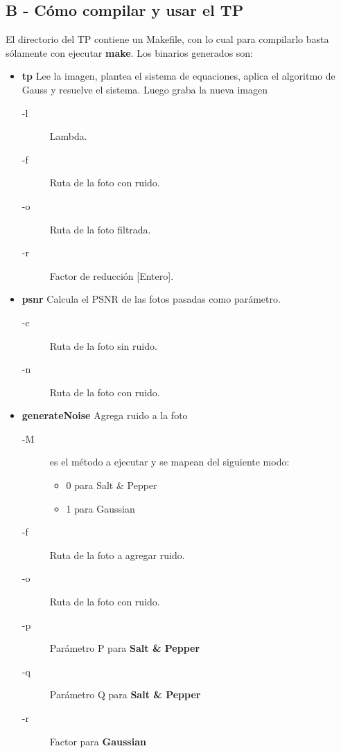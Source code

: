\documentclass[a4paper]{article}
\begin{document}
\newpage

\subsection{B - Cómo compilar y usar el TP}
El directorio del TP contiene un Makefile, con lo cual para compilarlo basta sólamente con ejecutar \textbf{make}. Los binarios generados son: 

\begin{itemize}
  \item \textbf{tp} Lee la imagen, plantea el sistema de equaciones, aplica el algoritmo de Gauss y resuelve el sistema. Luego graba la nueva imagen
  \begin{description}
	\item[-l] Lambda.
	\item[-f] Ruta de la foto con ruido.
	\item[-o] Ruta de la foto filtrada.
	\item[-r] Factor de reducción [Entero].
  \end{description}


  \item \textbf{psnr} Calcula el PSNR de las fotos pasadas como parámetro.
  \begin{description}
	\item[-c] Ruta de la foto sin ruido.
	\item[-n] Ruta de la foto con ruido.
  \end{description}

  \item \textbf{generateNoise} Agrega ruido a la foto
  \begin{description}
	\item[-M] es el método a ejecutar y se mapean del siguiente modo:
	\begin{itemize}
	   \item 0 para Salt \& Pepper
	   \item 1 para Gaussian
         \end{itemize}

	\item[-f] Ruta de la foto a agregar ruido.
	\item[-o] Ruta de la foto con ruido.
	\item[-p] Parámetro P para \textbf{Salt \& Pepper}
	\item[-q] Parámetro Q para \textbf{Salt \& Pepper}
	\item[-r] Factor para \textbf{Gaussian}
  \end{description}

\end{itemize}

\newpage

\end{document}
